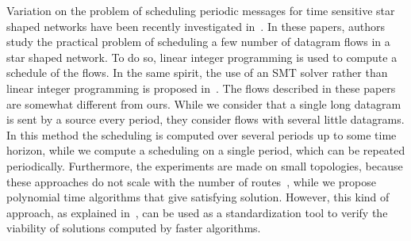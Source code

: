 \documentclass[a4paper,10pt]{journal}
\begin{document}

Variation on the problem of scheduling periodic messages for time sensitive star shaped networks have been recently investigated in~\cite{nayak2017incremental,steiner2018traffic,silviu2017,naresh2016}. In these papers, authors study the practical problem of scheduling a few number of datagram flows in a star shaped network. To do so, linear integer programming is used to compute a schedule of the flows. In the same spirit, the use of an SMT solver rather than linear integer programming is proposed in~\cite{dos2019tsnsched}. The flows described in these papers are somewhat different from ours. While we consider that a single long datagram is sent by a source every period, they consider flows with several little datagrams. In this method the scheduling is computed over several periods up to some time horizon, while we compute a scheduling on a single period, which can be repeated periodically. Furthermore, the experiments are made on small topologies, because these approaches do not scale with the number of routes~\cite{masoudi2020cost}, while we propose polynomial time algorithms that give satisfying solution. However, this kind of approach, as explained in~\cite{steiner2018traffic}, can be used as a standardization tool to verify the viability of solutions computed by faster algorithms. 

\end{document}
